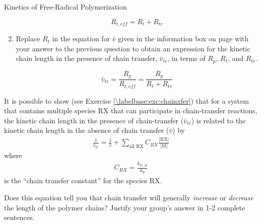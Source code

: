 \begin{activity}{Kinetics of Free-Radical Polymerization}
\begin{ctqs}
\begin{enumerate}
\begin{solution}[0.5in]
			\begin{equation*}
				R_{t,eff} = R_t + R_{tr}
			\end{equation*}
	
		\end{solution}
			
			\item Replace $R_t$ in the equation for $\bar v$ given in the information box on page \pageref{\labelbase:infobox:kineticchainlength} with your answer to the previous question to obtain an expression for the kinetic chain length in the presence of chain transfer, $\bar v_{tr}$, in terms of $R_p$, $R_t$, and $R_{tr}$.
		
		\begin{solution}[0.5in]
	
			\begin{equation*}
				\bar v_{tr} = \frac{R_p}{R_{t,eff}}  = \frac{R_p}{R_t + R_{tr}}
			\end{equation*}
	
		\end{solution}
		
		\end{enumerate}
		
\end{ctqs}

\begin{infobox}
\label{\labelbase:info:vtr}

	It is possible to show (see Exercise \ref{\labelbase:exc:chainxfer}) that for a system that contains multiple species RX that can participate in chain-transfer reactions, the kinetic chain length in the presence of chain-transfer ($\bar v_{tr}$) is related to the kinetic chain length in the absence of chain transfer ($\bar v$) by
	\begin{align*}
		\frac{1}{\bar v_{tr}} = \frac{1}{\bar v} + \sum_{\text{all RX}} C_{RX}\frac{\text{[RX]}}{\text{[M]}}
	\end{align*}
	where
	\begin{align*}
		C_{RX} = \frac{k_{tr,R}}{k_p}
	\end{align*}
	is the ``chain transfer constant'' for the species RX.
	
\end{infobox}

\begin{ctqs}

	\question Does this equation tell you that chain transfer will generally \emph{increase} or \emph{decrease} the length of the polymer chains?  Justify your group's answer in 1-2 complete sentences.
	

\end{ctqs}
\end{activity}

